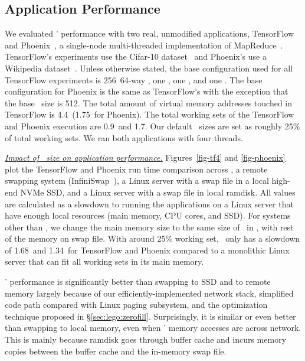 \subsection{Application Performance}
\label{sec:appresults}
We evaluated \lego' performance with two real, unmodified applications, 
TensorFlow~\cite{TensorFlow} and Phoenix~\cite{Ranger07-HPCA}, a single-node multi-threaded implementation of MapReduce~\cite{DeanEtAl04-MapReduce}.
TensorFlow's experiments use the Cifar-10 dataset~\cite{CIFAR-DS} and Phoenix's use a Wikipedia dataset~\cite{Wiki-DS}.
Unless otherwise stated, the base configuration used for all TensorFlow experiments
is 256\MB\ 64-way \excache, one \pcomponent, one \mcomponent, and one \scomponent.
The base configuration for Phoenix is the same as TensorFlow's with the exception that the base \excache\ size is 512\MB.
The total amount of virtual memory addresses touched in TensorFlow is 4.4\GB\ (1.75\GB\ for Phoenix).
The total working sets of the TensorFlow and Phoenix execution are 0.9\GB\ and 1.7\GB.
Our default \excache\ sizes are set as roughly 25\% of total working sets.
We ran both applications with four threads.

\textit{\uline{Impact of \excache\ size on application performance.}}
Figures~\ref{fig-tf4} and \ref{fig-phoenix} plot the TensorFlow and Phoenix run time comparison across 
\lego, a remote swapping system (InfiniSwap~\cite{GU17-NSDI}), 
a Linux server with a swap file in a local high-end NVMe SSD, 
and a Linux server with a swap file in local ramdisk.
All values are calculated as a slowdown to running the applications on a Linux server that have enough local resources (main memory, CPU cores, and SSD).
For systems other than \lego, we change the main memory size to the same size of \excache\ in \lego, with rest of the memory on swap file. 
With around 25\% working set, \lego\ only has a slowdown of 1.68\x\ and 1.34\x\ for TensorFlow and Phoenix
compared to a monolithic Linux server that can fit all working sets in its main memory.

\lego' performance is significantly better than swapping to SSD and to remote memory 
largely because of our efficiently-implemented network stack, simplified code path compared with Linux paging subsystem,
and the optimization technique proposed in \S\ref{sec:lego:zerofill}.
Surprisingly, it is similar or even better than swapping to local memory, even when \lego' memory accesses are across network.
This is mainly because ramdisk goes through buffer cache and incurs memory copies between the buffer cache and the in-memory swap file.


